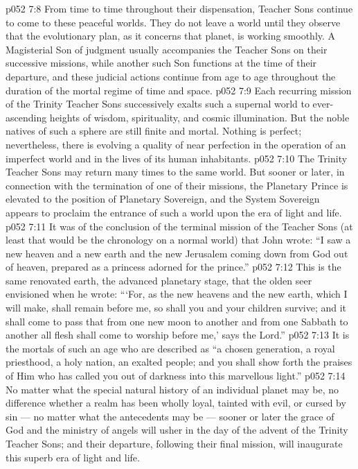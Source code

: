 \vs p052 7:8 \pc From time to time throughout their dispensation, Teach\-er Sons continue to come to these peaceful worlds. They do not leave a world until they observe that the evolutionary plan, as it concerns that planet, is working smoothly. A Magisterial Son of judgment usually accompanies the Teacher Sons on their successive missions, while another such Son functions at the time of their departure, and these judicial actions continue from age to age throughout the duration of the mortal regime of time and space.
\vs p052 7:9 Each recurring mission of the Trinity Teacher Sons successively exalts such a supernal world to ever\hyp{}ascending heights of wisdom, spirituality, and cosmic illumination. But the noble natives of such a sphere are still finite and mortal. Nothing is perfect; nevertheless, there is evolving a quality of near perfection in the operation of an imperfect world and in the lives of its human inhabitants.
\vs p052 7:10 \pc The Trinity Teacher Sons may return many times to the same world. But sooner or later, in connection with the termination of one of their missions, the Planetary Prince is elevated to the position of Planetary Sovereign, and the System Sovereign appears to proclaim the entrance of such a world upon the era of light and life.
\vs p052 7:11 It was of the conclusion of the terminal mission of the Teacher Sons (at least that would be the chronology on a normal world) that John wrote: “I saw a new heaven and a new earth and the new Jerusalem coming down from God out of heaven, prepared as a princess adorned for the prince.”
\vs p052 7:12 This is the same renovated earth, the advanced planetary stage, that the olden seer envisioned when he wrote: “‘For, as the new heavens and the new earth, which I will make, shall remain before me, so shall you and your children survive; and it shall come to pass that from one new moon to another and from one Sabbath to another all flesh shall come to worship before me,’ says the Lord.”
\vs p052 7:13 It is the mortals of such an age who are described as “a chosen generation, a royal priesthood, a holy nation, an exalted people; and you shall show forth the praises of Him who has called you out of darkness into this marvellous light.”
\vs p052 7:14 \pc No matter what the special natural history of an individual planet may be, no difference whether a realm has been wholly loyal, tainted with evil, or cursed by sin --- no matter what the antecedents may be --- sooner or later the grace of God and the ministry of angels will usher in the day of the advent of the Trinity Teacher Sons; and their departure, following their final mission, will inaugurate this superb era of light and life.
